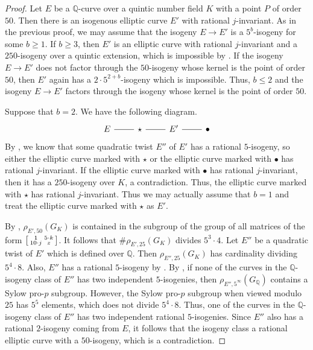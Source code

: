\documentclass[10pt,leqno]{amsart}
\newcommand\sm[1]{\begin{bsmallmatrix}#1\end{bsmallmatrix}}
\newcommand{\Q}{\mathbb{Q}}
\theoremstyle{definition}
\theoremstyle{remark}
\numberwithin{theorem}{section}
\begin{document}
\begin{proof}
    Let $E$ be a $\Q$-curve over a quintic number field $K$ with a point $P$ of order $50$. Then there is an isogenous elliptic curve $E'$ with rational $j$-invariant. As in the previous proof, we may assume that the isogeny $E \to E'$ is a $5^b$-isogeny for some $b\geq 1$. If $b\geq 3$, then $E'$ is an elliptic curve with rational $j$-invariant and a $250$-isogeny over a quintic extension, which is impossible by \cite[Theorem 1.3]{ja}. If the isogeny $E \to E'$ does not factor through the $50$-isogeny whose kernel is the point of order $50$, then $E'$ again has a $2\cdot 5^{2+b}$-isogeny which is impossible. Thus, $b\leq 2$ and the isogeny $E \to E'$ factors through the isogeny whose kernel is the point of order $50$.

    Suppose that $b=2$. We have the following diagram. 
    \[\begin{tikzcd}
	E & \star & {E'} & \bullet
	\arrow[no head, from=1-1, to=1-2]
	\arrow[no head, from=1-2, to=1-3]
	\arrow[no head, from=1-3, to=1-4]
\end{tikzcd}\]
By , we know that some quadratic twist $E''$ of $E'$ has a rational $5$-isogeny, so either the elliptic curve marked with $\star$ or the elliptic curve marked with $\bullet$ has rational $j$-invariant. If the elliptic curve marked with $\bullet$ has rational $j$-invariant, then it has a $250$-isogeny over $K$, a contradiction. Thus, the elliptic curve marked with $\star$ has rational $j$-invariant. Thus we may actually assume that $b=1$ and treat the elliptic curve marked with $\star$ as $E'$.

By , $\rho_{E', 50}(G_K)$ is contained in the subgroup of the group of all matrices of the form $\sm{1 & 5\cdot k \\
    10 \cdot j & z}$. It follows that $\#\rho_{E',25}(G_K)$ divides $5^3\cdot 4$. Let $E''$ be a quadratic twist of $E'$ which is defined over $\Q$. Then $\rho_{E'', 25}(G_K)$ has cardinality dividing $5^4\cdot 8$. Also, $E''$ has a rational $5$-isogeny by . By \cite[Theorem 2]{greenberg}, if none of the curves in the $\Q$-isogeny class of $E''$ has two independent $5$-isogenies, then $\rho_{E'', 5^\infty}(G_\Q)$ contains a Sylow pro-$p$ subgroup. However, the Sylow pro-$p$ subgroup when viewed modulo $25$ has $5^5$ elements, which does not divide $5^4\cdot 8$. Thus, one of the curves in the $\Q$-isogeny class of $E''$ has two independent rational $5$-isogenies. Since $E''$ also has a rational $2$-isogeny coming from $E$, it follows that the isogeny class a rational elliptic curve with a $50$-isogeny, which is a contradiction.
\end{proof}
\end{document}
